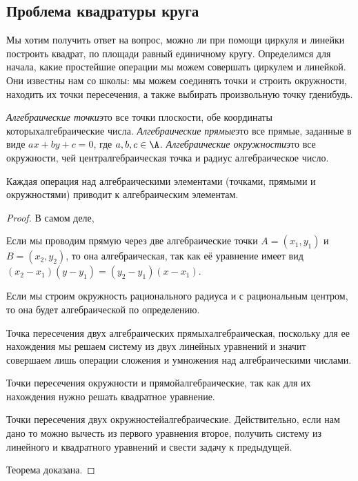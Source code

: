 \documentclass[a4paper]{article}
\begin{document}
\subsection{Проблема квадратуры круга}
Мы хотим получить ответ на вопрос, можно ли при помощи циркуля и линейки построить квадрат, по площади равный
единичному кругу. Определимся для начала, какие простейшие операции мы можем совершать циркулем и линейкой.
Они известны нам со школы: мы можем соединять точки и строить окружности, находить их точки пересечения,
а также выбирать произвольную точку где\д нибудь.

\begin{df}
\emph{Алгебраические точки}\т это все точки плоскости, обе координаты которых\т алгебраические числа.
\emph{Алгебраические прямые}\т это все прямые, заданные в виде $ax+by+c=0$, где $a,b,c\in\A$.
\emph{Алгебраические окружности}\т это все окружности, чей центр\т алгебраическая точка и радиус\т
алгебраическое число.
\end{df}

\begin{theorem}
Каждая операция над алгебраическими элементами (точками, прямыми и окружностями) приводит к алгебраическим элементам.
\end{theorem}
\begin{proof}
В самом деле,
\begin{nums}{-1}
\item Если мы проводим прямую через две алгебраические точки $A=(x_1,y_1)$ и $B=(x_2,y_2)$, то она
      алгебраическая, так как её уравнение имеет вид $(x_2-x_1)(y-y_1)=(y_2-y_1)(x-x_1)$.
\item Если мы строим окружность рационального радиуса и с рациональным центром, то она будет
      алгебраической по определению.
\item Точка пересечения двух алгебраических прямых\т алгебраическая, поскольку для ее нахождения мы решаем
      систему из двух линейных уравнений и значит совершаем лишь операции сложения и умножения над
      алгебраическими числами.
\item Точки пересечения окружности и прямой\т алгебраические, так как для их нахождения нужно решать
      квадратное уравнение.
\item Точки пересечения двух окружностей\т алгебраические. Действительно, если нам дано
      то можно вычесть из первого уравнения второе, получить систему из линейного и квадратного
      уравнений и свести задачу к предыдущей.
\end{nums}
Теорема доказана.
\end{proof}
\end{document}
